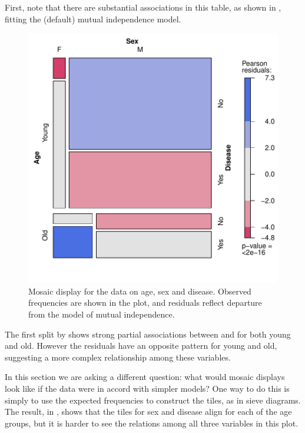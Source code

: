 \documentclass[11pt]{book}
\renewenvironment{knitrout}{\small\renewcommand{\baselinestretch}{.85}}{} %
\begin{document}
First, note that there are substantial associations in this table, as shown in
, fitting the (default) mutual independence model. 
\begin{knitrout}
\color{fgcolor}\begin{kframe}
\begin{alltt}
 \hlstd{=}\hlstd{)}
\end{alltt}
\end{kframe}\begin{figure}[!htbp]


\centerline{\includegraphics[width=.6\textwidth]{ch05/fig/struc-mos1} }

\caption[Mosaic display for the data on age, sex and disease]{Mosaic display for the data on age, sex and disease. Observed frequencies are shown in the plot, and residuals reflect departure from the model of mutual independence.\label{fig:struc-mos1}}
\end{figure}


\end{knitrout}
The first split by  shows strong partial
associations between  and  for both young and old.
However the residuals have an opposite pattern for young and old, suggesting
a more complex relationship among these variables.

In this section we are asking a different question: what would mosaic displays look
like if the data were in accord with simpler models?  One way to do this is simply
to use the expected frequencies to construct the tiles, as in sieve diagrams.
The result, in , shows that the tiles for sex and disease
align for each of the age groups, but it is harder to see the relations among all
three variables in this plot.
\end{document}
